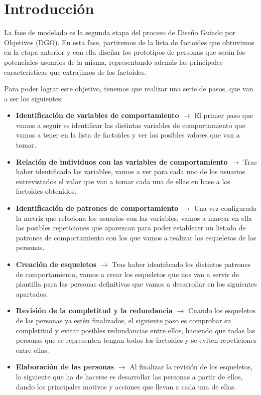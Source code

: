 \section{Introducción}
La fase de modelado es la segunda etapa del proceso de Diseño Guiado por Objetivos (DGO). En esta fase, partiremos de la lista de factoides que
obtuvimos en la etapa anterior y con ella diseñar los prototipos de personas que serán los potenciales usuarios de la misma, representando además
las principales características que extrajimos de los factoides.

Para poder lograr este objetivo, tenemos que realizar una serie de pasos, que van a ser los siguientes:
\begin{itemize}
    \item \textbf{Identificación de variables de comportamiento} $\rightarrow$ El primer paso que vamos a seguir es identificar las distintas variables de comportamiento que vamos a tener en la lista de factoides y ver los posibles valores que van a tomar.
    \item \textbf{Relación de individuos con las variables de comportamiento} $\rightarrow$ Tras haber identificado las variables, vamos a ver para cada uno de los usuarios entrevistados el valor que van a tomar cada una de ellas en base a los factoides obtenidos.
    \item \textbf{Identificación de patrones de comportamiento} $\rightarrow$ Una vez configurada la metriz que relaciona los usuarios con las variables, vamos a marcar en ella las posibles repeticiones que aparezcan para poder establecer un listado de patrones de comportamiento con los que vamos a realizar los esqueletos de las personas.
    \item \textbf{Creación de esqueletos} $\rightarrow$ Tras haber identificado los distintos patrones de comportamiento, vamos a crear los esqueletos que nos van a servir de plantilla para las personas definitivas que vamos a desarrollar en los siguientes apartados.
    \item \textbf{Revisión de la completitud y la redundancia} $\rightarrow$ Cuando los esqueletos de las personas ya estén finalizados, el siguiente paso es comprobar su completitud y evitar posibles redundancias entre ellos, haciendo que todas las personas que se representen tengan todos los factoides y se eviten repeticiones entre ellas.
    \item \textbf{Elaboración de las personas} $\rightarrow$ Al finalizar la revisión de los esqueletos, lo siguiente que ha de hacerse es desarrollar las personas a partir de ellos, dando los principales motivos y acciones que llevan a cada una de ellas.

\end{itemize}
